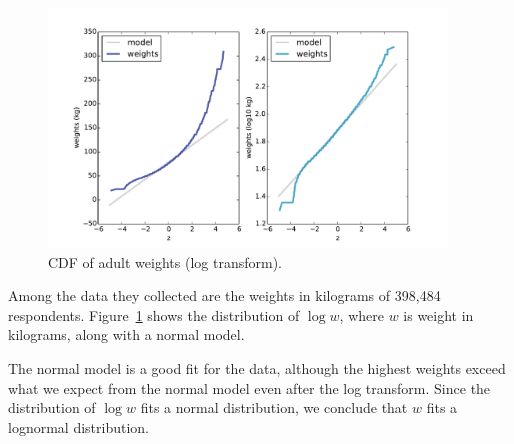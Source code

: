 \documentclass[12pt]{book}
\begin{document}
\begin{figure}
\centerline{
\includegraphics[height=2.5in]{figs/brfss_weight_log.pdf}
}
\caption{CDF of adult weights (log
  transform).}
\label{brfss_weight_log}
\end{figure}

Among the data they collected are the weights in kilograms of
398,484 respondents.
Figure~\ref{brfss_weight_log} shows the distribution
of $\log w$, where $w$ is weight in kilograms, along with a normal
model.

The normal model is a good fit for the data, although the highest
weights exceed what we expect from the normal model even after the log
transform.  Since the distribution of $\log w$ fits a normal
distribution, we conclude that $w$ fits a lognormal distribution.
 
 
 





\end{document}
